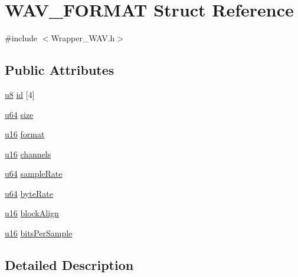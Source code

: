 \hypertarget{struct_w_a_v___f_o_r_m_a_t}{}\section{W\+A\+V\+\_\+\+F\+O\+R\+M\+AT Struct Reference}
\label{struct_w_a_v___f_o_r_m_a_t}


{\ttfamily \#include $<$Wrapper\+\_\+\+W\+A\+V.\+h$>$}

\subsection*{Public Attributes}
\begin{DoxyCompactItemize}
\item 
\mbox{\hyperlink{_util_8h_aed742c436da53c1080638ce6ef7d13de}{u8}} \mbox{\hyperlink{struct_w_a_v___f_o_r_m_a_t_af7e4d036ae594f619322a763fc446ff7}{id}} \mbox{[}4\mbox{]}
\item 
\mbox{\hyperlink{_util_8h_ad758b7a5c3f18ed79d2fcd23d9f16357}{u64}} \mbox{\hyperlink{struct_w_a_v___f_o_r_m_a_t_aa74155b8a7752c37742f87257f00c8d2}{size}}
\item 
\mbox{\hyperlink{_util_8h_a9e6c91d77e24643b888dbd1a1a590054}{u16}} \mbox{\hyperlink{struct_w_a_v___f_o_r_m_a_t_ac134cc6cea6c862472878750b8a58071}{format}}
\item 
\mbox{\hyperlink{_util_8h_a9e6c91d77e24643b888dbd1a1a590054}{u16}} \mbox{\hyperlink{struct_w_a_v___f_o_r_m_a_t_a770422b2ee3c7cd4088f7ab1a39e5d5e}{channels}}
\item 
\mbox{\hyperlink{_util_8h_ad758b7a5c3f18ed79d2fcd23d9f16357}{u64}} \mbox{\hyperlink{struct_w_a_v___f_o_r_m_a_t_a5dc7fe93937eb8425a426c9850cbf8e7}{sample\+Rate}}
\item 
\mbox{\hyperlink{_util_8h_ad758b7a5c3f18ed79d2fcd23d9f16357}{u64}} \mbox{\hyperlink{struct_w_a_v___f_o_r_m_a_t_adbd0c076fe11a16cd50a2a5d35073ed8}{byte\+Rate}}
\item 
\mbox{\hyperlink{_util_8h_a9e6c91d77e24643b888dbd1a1a590054}{u16}} \mbox{\hyperlink{struct_w_a_v___f_o_r_m_a_t_a0b8b6e4f20ab7c230636ebe3dd89bed8}{block\+Align}}
\item 
\mbox{\hyperlink{_util_8h_a9e6c91d77e24643b888dbd1a1a590054}{u16}} \mbox{\hyperlink{struct_w_a_v___f_o_r_m_a_t_a4daa49634140cfc7ba5a88222380551e}{bits\+Per\+Sample}}
\end{DoxyCompactItemize}


\subsection{Detailed Description}


